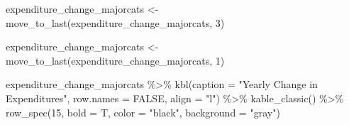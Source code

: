 \documentclass[
  letterpaper,
  DIV=11,
  numbers=noendperiod]{scrreport}
\newenvironment{Shaded}{\begin{snugshade}}{\end{snugshade}}
\newcommand{\AttributeTok}[1]{\textcolor[rgb]{0.40,0.45,0.13}{#1}}
\newcommand{\ConstantTok}[1]{\textcolor[rgb]{0.56,0.35,0.01}{#1}}
\newcommand{\DecValTok}[1]{\textcolor[rgb]{0.68,0.00,0.00}{#1}}
\newcommand{\FunctionTok}[1]{\textcolor[rgb]{0.28,0.35,0.67}{#1}}
\newcommand{\NormalTok}[1]{\textcolor[rgb]{0.00,0.23,0.31}{#1}}
\newcommand{\OtherTok}[1]{\textcolor[rgb]{0.00,0.23,0.31}{#1}}
\newcommand{\SpecialCharTok}[1]{\textcolor[rgb]{0.37,0.37,0.37}{#1}}
\newcommand{\StringTok}[1]{\textcolor[rgb]{0.13,0.47,0.30}{#1}}
\begin{document}
\begin{Shaded}
\begin{Highlighting}[]
\NormalTok{expenditure\_change\_majorcats }\OtherTok{\textless{}{-}} \FunctionTok{move\_to\_last}\NormalTok{(expenditure\_change\_majorcats, }\DecValTok{3}\NormalTok{) }

\NormalTok{expenditure\_change\_majorcats }\OtherTok{\textless{}{-}} \FunctionTok{move\_to\_last}\NormalTok{(expenditure\_change\_majorcats, }\DecValTok{1}\NormalTok{)}

\NormalTok{expenditure\_change\_majorcats }\SpecialCharTok{\%\textgreater{}\%} 
  \FunctionTok{kbl}\NormalTok{(}\AttributeTok{caption =} \StringTok{"Yearly Change in Expenditures"}\NormalTok{, }\AttributeTok{row.names =} \ConstantTok{FALSE}\NormalTok{, }\AttributeTok{align =} \StringTok{"l"}\NormalTok{) }\SpecialCharTok{\%\textgreater{}\%} 
  \FunctionTok{kable\_classic}\NormalTok{() }\SpecialCharTok{\%\textgreater{}\%}
    \FunctionTok{row\_spec}\NormalTok{(}\DecValTok{15}\NormalTok{, }\AttributeTok{bold =}\NormalTok{ T, }\AttributeTok{color =} \StringTok{"black"}\NormalTok{, }\AttributeTok{background =} \StringTok{"gray"}\NormalTok{)}
\end{Highlighting}
\end{Shaded}
\end{document}
